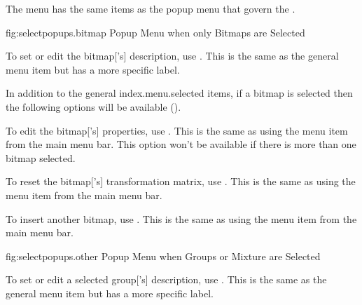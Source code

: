 The  menu has the same items as the
 popup menu that govern the
.



\FloatFig
  {fig:selectpopups.bitmap}
  {}
  {Popup Menu when only Bitmaps are Selected}


To set or edit the \gls{bitmap}['s] description, use
. This is the same as
the general  menu item but has a more specific label.

In addition to the general \gls{index.menu.selected} items,
if a \gls{bitmap} is selected then the following options will be available
().


To edit the \gls{bitmap}['s] properties, use
. This is the same as using
the  menu item from the main menu bar.
This option won't be available if there is more than one
\gls{bitmap} selected.


To reset the \gls{bitmap}['s]
transformation matrix, use . This is the
same as using the  menu item from the main menu
bar.


To insert another \gls{bitmap}, use . This is the
same as using the  menu item from the main menu
bar.



\FloatFig
  {fig:selectpopups.other}
  {}
  {Popup Menu when Groups or Mixture are Selected}


To set or edit a selected \gls{group}['s] description, use
. This is the same as
the general  menu item but has a more specific label.

